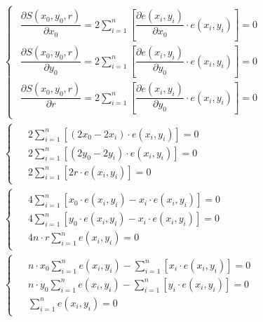 \begin{align}
    \nonumber
    &\begin{cases}
         \begin{aligned}
             \dfrac{\partial S(x_0, y_0, r)}{\partial x_0} = 2 \sum_{i=1}^{n} \left[
             \dfrac{\partial e(x_i, y_i)}{\partial x_0} \cdot e(x_i, y_i) \right] = 0 \\
             \dfrac{\partial S(x_0, y_0, r)}{\partial y_0} = 2 \sum_{i=1}^{n} \left[
             \dfrac{\partial e(x_i, y_i)}{\partial y_0} \cdot e(x_i, y_i)\right] = 0 \\
             \dfrac{\partial S(x_0, y_0, r)}{\partial r} = 2 \sum_{i=1}^{n} \left[
             \dfrac{\partial e(x_i, y_i)}{\partial y_0} \cdot e(x_i, y_i)\right] = 0
         \end{aligned}
    \end{cases} \\ \nonumber
    &\begin{cases}
         \begin{aligned}
             &2 \sum_{i=1}^{n} \left[ (2 x_0 - 2 x_i) \cdot e(x_i, y_i) \right] = 0 \\
             &2 \sum_{i=1}^{n} \left[ (2 y_0 - 2 y_i) \cdot e(x_i, y_i) \right] = 0 \\
             &2 \sum_{i=1}^{n} \left[ 2 r \cdot e(x_i, y_i) \right] = 0
         \end{aligned}
    \end{cases} \\ \nonumber
    &\begin{cases}
         \begin{aligned}
             &4 \sum_{i=1}^{n} \left[ x_0 \cdot e(x_i, y_i) - x_i \cdot e(x_i, y_i) \right] = 0 \\
             &4 \sum_{i=1}^{n} \left[ y_0 \cdot e(x_i, y_i) - x_i \cdot e(x_i, y_i) \right] = 0 \\
             &4 n \cdot r \sum_{i=1}^{n} e(x_i, y_i) = 0
         \end{aligned}
    \end{cases} \\
    &\begin{cases}
         \label{eq:Circle_MNK_system}
         \begin{aligned}
             &n \cdot x_0 \sum_{i=1}^{n} e(x_i, y_i)
             - \sum_{i=1}^{n} \left[ x_i \cdot e(x_i, y_i) \right] = 0 \\
             &n \cdot y_0 \sum_{i=1}^{n} e(x_i, y_i)
             - \sum_{i=1}^{n} \left[ y_i \cdot e(x_i, y_i) \right] = 0 \\
             &\sum_{i=1}^{n} e(x_i, y_i) = 0
         \end{aligned}
    \end{cases}
\end{align} \\

